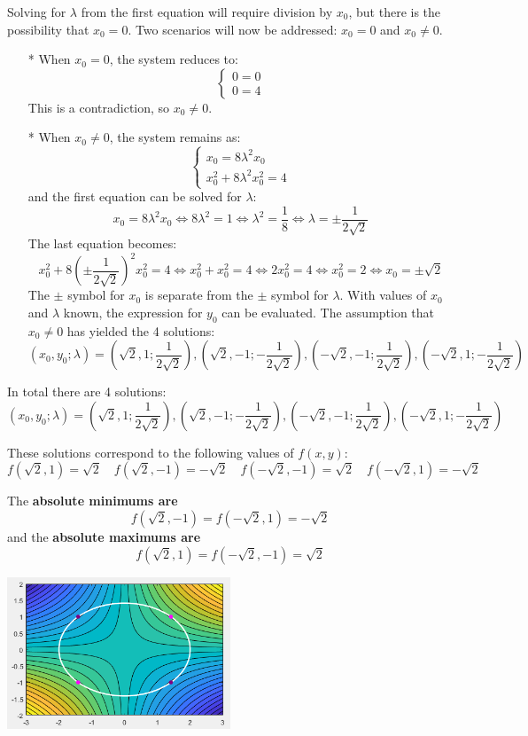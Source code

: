 \documentclass{article}
\begin{document}
\begin{itemize}
Solving for \(\lambda\) from the first equation will require division by \(x_0\), but there is the possibility that \(x_0 = 0\). Two scenarios will now be addressed: \(x_0 = 0\) and \(x_0 \neq 0\). 
\begin{itemize}
\item[*] 
When \(x_0 = 0\), the system reduces to:
\[\left\{\begin{array}{c}
0 = 0 \\ 
0 = 4 
\end{array}\right.\]
This is a contradiction, so \(x_0 \neq 0\).
\item[*] 
When \(x_0 \neq 0\), the system remains as:
\[\left\{\begin{array}{c}
x_0 = 8\lambda^2 x_0 \\ 
x_0^2 + 8\lambda^2 x_0^2 = 4 
\end{array}\right.\]
and the first equation can be solved for \(\lambda\): 
\[x_0 = 8\lambda^2 x_0 \iff 8\lambda^2 = 1 \iff \lambda^2 = \frac{1}{8} \iff \lambda = \pm \frac{1}{2\sqrt{2}}\]
The last equation becomes:
\[x_0^2 + 8(\pm \frac{1}{2\sqrt{2}})^2 x_0^2 = 4  \iff x_0^2 + x_0^2 = 4 \iff 2x_0^2 = 4 \iff x_0^2 = 2 \iff x_0 = \pm\sqrt{2}\]
The \(\pm\) symbol for \(x_0\) is separate from the \(\pm\) symbol for \(\lambda\). With values of \(x_0\) and \(\lambda\) known, the expression for \(y_0\) can be evaluated. The assumption that \(x_0 \neq 0\) has yielded the 4 solutions:
\[(x_0, y_0; \lambda) = (\sqrt{2}, 1; \frac{1}{2\sqrt{2}}), (\sqrt{2}, -1; -\frac{1}{2\sqrt{2}}), (-\sqrt{2}, -1; \frac{1}{2\sqrt{2}}), (-\sqrt{2}, 1; -\frac{1}{2\sqrt{2}})\]
\end{itemize}
In total there are 4 solutions:
\[(x_0, y_0; \lambda) = (\sqrt{2}, 1; \frac{1}{2\sqrt{2}}), (\sqrt{2}, -1; -\frac{1}{2\sqrt{2}}), (-\sqrt{2}, -1; \frac{1}{2\sqrt{2}}), (-\sqrt{2}, 1; -\frac{1}{2\sqrt{2}})\] 

These solutions correspond to the following values of \(f(x,y)\):
\[f(\sqrt{2}, 1) = \sqrt{2} \quad f(\sqrt{2}, -1) = -\sqrt{2} \quad f(-\sqrt{2}, -1) = \sqrt{2} \quad f(-\sqrt{2}, 1) = -\sqrt{2} \]

The {\bf absolute minimums are}
\[f(\sqrt{2}, -1) = f(-\sqrt{2}, 1) = -\sqrt{2}\]
and the {\bf absolute maximums are}
\[f(\sqrt{2}, 1) = f(-\sqrt{2}, -1) = \sqrt{2}\]

\begin{center}
\includegraphics[width = 0.5\textwidth]{lagrange_2.png}
\end{center}




\end{itemize}
\end{document}
